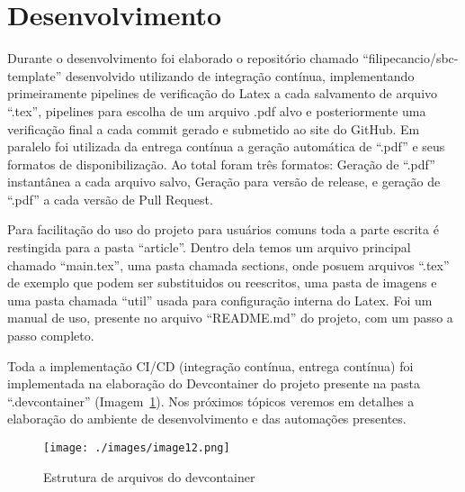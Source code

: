 \section{Desenvolvimento}

Durante o desenvolvimento foi elaborado o repositório chamado ``filipecancio/sbc-template'' desenvolvido utilizando de integração contínua, implementando primeiramente pipelines de verificação do Latex a cada salvamento de arquivo ``.tex'', pipelines para escolha de um arquivo .pdf alvo e posteriormente uma verificação final a cada commit gerado e submetido ao site do GitHub. Em paralelo foi utilizada da entrega contínua a geração automática de ``.pdf'' e seus formatos de disponibilização. Ao total foram três formatos: Geração de ``.pdf'' instantânea a cada arquivo salvo, Geração para versão de release, e geração de ``.pdf'' a cada versão de Pull Request.

Para facilitação do uso do projeto para usuários comuns toda a parte escrita é restingida para a pasta ``article''. Dentro dela temos um arquivo principal chamado ``main.tex'', uma pasta chamada sections, onde posuem arquivos ``.tex'' de exemplo que podem ser substituidos ou reescritos, uma pasta de imagens e uma pasta chamada ``util'' usada para configuração interna do Latex.
Foi um manual de uso, presente no arquivo ``README.md'' do projeto, com um passo a passo completo.

Toda a implementação CI/CD (integração contínua, entrega contínua) foi implementada na elaboração do Devcontainer do projeto presente na pasta ``.devcontainer'' (Imagem~\ref{fig:image12}). Nos próximos tópicos veremos em detalhes a elaboração do ambiente de desenvolvimento e das automações
presentes.

\begin{figure}[ht]
	\centering
	\texttt{[image: ./images/image12.png]}
	\caption{Estrutura de arquivos do devcontainer}
	\label{fig:image12}
\end{figure}